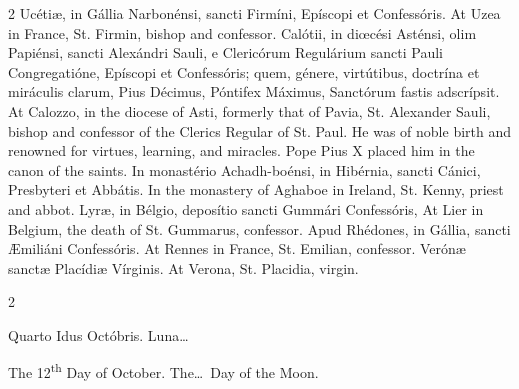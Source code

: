 \begin{paracol}{2}
Ucétiæ, in Gállia 
 Narbonénsi, sancti Firmíni, Epíscopi et Confessóris.
\switchcolumn
{}
At Uzea in France, St. Firmin, 
 bishop and confessor.
\switchcolumn*
{}
Calótii, in diœcési 
 Asténsi, olim Papiénsi, sancti Alexándri Sauli, e Clericórum Regulárium 
 sancti Pauli Congregatióne, Epíscopi et Confessóris; quem, génere, 
 virtútibus, doctrína et miráculis clarum, Pius Décimus, Póntifex Máximus, 
 Sanctórum fastis adscrípsit.
\switchcolumn
{}
At Calozzo, in the diocese of Asti, 
 formerly that of Pavia, St. Alexander Sauli, bishop and confessor of the 
 Clerics Regular of St. Paul. He was of noble birth and renowned for 
 virtues, learning, and miracles. Pope Pius X placed him in the canon 
 of the saints.
\switchcolumn*
{}
In monastério 
 Achadh-boénsi, in Hibérnia, sancti Cánici, Presbyteri et Abbátis.
\switchcolumn
{}
In the monastery of Aghaboe in 
 Ireland, St. Kenny, priest and abbot.
\switchcolumn*
{}
Lyræ, in Bélgio, 
 deposítio sancti Gummári Confessóris,
\switchcolumn
{}
At Lier in Belgium, the death of St. 
 Gummarus, confessor.
\switchcolumn*
{}
Apud Rhédones, in 
 Gállia, sancti Æmiliáni Confessóris.
\switchcolumn
{}
At Rennes in France, St. Emilian, 
 confessor.
\switchcolumn*
{}
Verónæ sanctæ Placídiæ 
 Vírginis.
\switchcolumn
{}
At Verona, St. Placidia, virgin.
\switchcolumn*
{}
\end{paracol}


\begin{paracol}{2}
\begin{center}{\color{gregoriocolor} Quarto Idus Octóbris. 
 Luna\dots\ }\end{center}
\switchcolumn
{}
\begin{center}{\color{gregoriocolor} The   12\textsuperscript{th} Day of 
 October. The\dots\ Day of the Moon.}\end{center}
\end{paracol}

